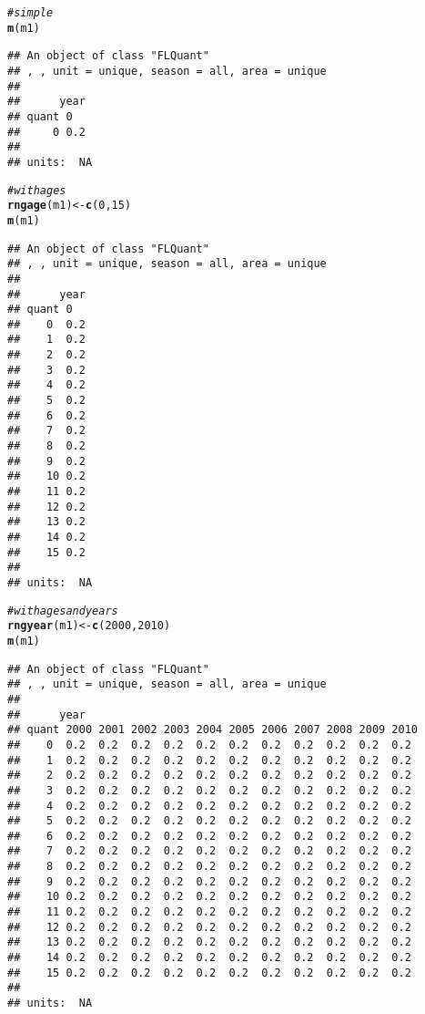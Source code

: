 \documentclass[a4paper,english,10pt]{article}\usepackage[]{graphicx}\usepackage[]{color}
\makeatletter
\newcommand{\hlnum}[1]{\textcolor[rgb]{0.686,0.059,0.569}{#1}}%
\newcommand{\hlcom}[1]{\textcolor[rgb]{0.678,0.584,0.686}{\textit{#1}}}%
\newcommand{\hlstd}[1]{\textcolor[rgb]{0.345,0.345,0.345}{#1}}%
\newcommand{\hlkwb}[1]{\textcolor[rgb]{0.69,0.353,0.396}{#1}}%
\newcommand{\hlkwd}[1]{\textcolor[rgb]{0.737,0.353,0.396}{\textbf{#1}}}%
\newenvironment{kframe}{%
 \def\at@end@of@kframe{}%
 \ifinner\ifhmode%
  \def\at@end@of@kframe{\end{minipage}}%
  \begin{minipage}{\columnwidth}%
 \fi\fi%
 \def\FrameCommand##1{\hskip\@totalleftmargin \hskip-\fboxsep
 \colorbox{shadecolor}{##1}\hskip-\fboxsep
     \hskip-\linewidth \hskip-\@totalleftmargin \hskip\columnwidth}%
 \MakeFramed {\advance\hsize-\width
   \@totalleftmargin\z@ \linewidth\hsize
   \@setminipage}}%
 {\par\unskip\endMakeFramed%
 \at@end@of@kframe}
\newenvironment{knitrout}{}{} %
\makeatother
\begin{document}
\begin{knitrout}
\color{fgcolor}\begin{kframe}
\begin{alltt}
\hlcom{# simple}
\hlkwd{m}\hlstd{(m1)}
\end{alltt}
\begin{verbatim}
## An object of class "FLQuant"
## , , unit = unique, season = all, area = unique
## 
##      year
## quant 0  
##     0 0.2
## 
## units:  NA
\end{verbatim}
\begin{alltt}
\hlcom{# with ages}
\hlkwd{rngage}\hlstd{(m1)} \hlkwb{<-} \hlkwd{c}\hlstd{(}\hlnum{0}\hlstd{,} \hlnum{15}\hlstd{)}
\hlkwd{m}\hlstd{(m1)}
\end{alltt}
\begin{verbatim}
## An object of class "FLQuant"
## , , unit = unique, season = all, area = unique
## 
##      year
## quant 0  
##    0  0.2
##    1  0.2
##    2  0.2
##    3  0.2
##    4  0.2
##    5  0.2
##    6  0.2
##    7  0.2
##    8  0.2
##    9  0.2
##    10 0.2
##    11 0.2
##    12 0.2
##    13 0.2
##    14 0.2
##    15 0.2
## 
## units:  NA
\end{verbatim}
\begin{alltt}
\hlcom{# with ages and years}
\hlkwd{rngyear}\hlstd{(m1)} \hlkwb{<-} \hlkwd{c}\hlstd{(}\hlnum{2000}\hlstd{,} \hlnum{2010}\hlstd{)}
\hlkwd{m}\hlstd{(m1)}
\end{alltt}
\begin{verbatim}
## An object of class "FLQuant"
## , , unit = unique, season = all, area = unique
## 
##      year
## quant 2000 2001 2002 2003 2004 2005 2006 2007 2008 2009 2010
##    0  0.2  0.2  0.2  0.2  0.2  0.2  0.2  0.2  0.2  0.2  0.2 
##    1  0.2  0.2  0.2  0.2  0.2  0.2  0.2  0.2  0.2  0.2  0.2 
##    2  0.2  0.2  0.2  0.2  0.2  0.2  0.2  0.2  0.2  0.2  0.2 
##    3  0.2  0.2  0.2  0.2  0.2  0.2  0.2  0.2  0.2  0.2  0.2 
##    4  0.2  0.2  0.2  0.2  0.2  0.2  0.2  0.2  0.2  0.2  0.2 
##    5  0.2  0.2  0.2  0.2  0.2  0.2  0.2  0.2  0.2  0.2  0.2 
##    6  0.2  0.2  0.2  0.2  0.2  0.2  0.2  0.2  0.2  0.2  0.2 
##    7  0.2  0.2  0.2  0.2  0.2  0.2  0.2  0.2  0.2  0.2  0.2 
##    8  0.2  0.2  0.2  0.2  0.2  0.2  0.2  0.2  0.2  0.2  0.2 
##    9  0.2  0.2  0.2  0.2  0.2  0.2  0.2  0.2  0.2  0.2  0.2 
##    10 0.2  0.2  0.2  0.2  0.2  0.2  0.2  0.2  0.2  0.2  0.2 
##    11 0.2  0.2  0.2  0.2  0.2  0.2  0.2  0.2  0.2  0.2  0.2 
##    12 0.2  0.2  0.2  0.2  0.2  0.2  0.2  0.2  0.2  0.2  0.2 
##    13 0.2  0.2  0.2  0.2  0.2  0.2  0.2  0.2  0.2  0.2  0.2 
##    14 0.2  0.2  0.2  0.2  0.2  0.2  0.2  0.2  0.2  0.2  0.2 
##    15 0.2  0.2  0.2  0.2  0.2  0.2  0.2  0.2  0.2  0.2  0.2 
## 
## units:  NA
\end{verbatim}
\end{kframe}
\end{knitrout}
\end{document}

